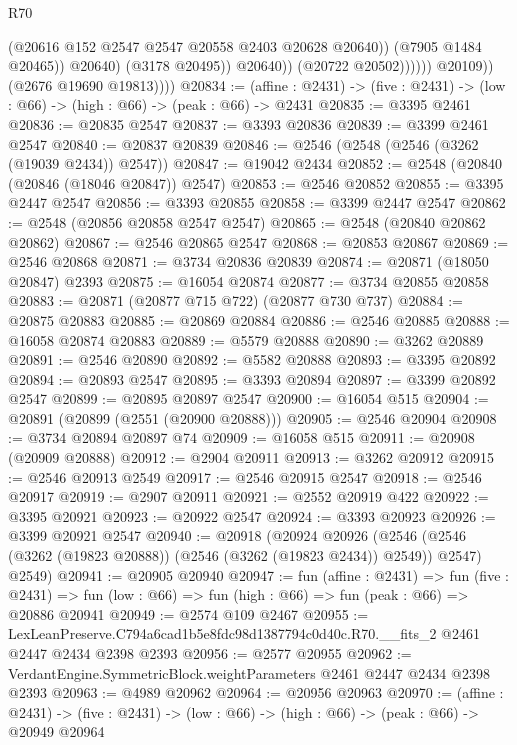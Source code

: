 \begin{lexlean}{R70}
\begin{coremodule}
                                    (@20616 @152 @2547 @2547 @20558 @2403 @20628 @20640))
                                  (@7905 @1484 @20465))
                                @20640)
                              (@3178 @20495))
                            @20640))
                        (@20722 @20502))))))
              @20109))
          (@2676 @19690 @19813))))
@20834 := (affine : @2431) -> (five : @2431) -> (low : @66) -> (high : @66) -> (peak : @66) -> @2431
@20835 := @3395 @2461
@20836 := @20835 @2547
@20837 := @3393 @20836
@20839 := @3399 @2461 @2547
@20840 := @20837 @20839
@20846 := @2546 (@2548 (@2546 (@3262 (@19039 @2434)) @2547))
@20847 := @19042 @2434
@20852 := @2548 (@20840 (@20846 (@18046 @20847)) @2547)
@20853 := @2546 @20852
@20855 := @3395 @2447 @2547
@20856 := @3393 @20855
@20858 := @3399 @2447 @2547
@20862 := @2548 (@20856 @20858 @2547 @2547)
@20865 := @2548 (@20840 @20862 @20862)
@20867 := @2546 @20865 @2547
@20868 := @20853 @20867
@20869 := @2546 @20868
@20871 := @3734 @20836 @20839
@20874 := @20871 (@18050 @20847) @2393
@20875 := @16054 @20874
@20877 := @3734 @20855 @20858
@20883 := @20871 (@20877 @715 @722) (@20877 @730 @737)
@20884 := @20875 @20883
@20885 := @20869 @20884
@20886 := @2546 @20885
@20888 := @16058 @20874 @20883
@20889 := @5579 @20888
@20890 := @3262 @20889
@20891 := @2546 @20890
@20892 := @5582 @20888
@20893 := @3395 @20892
@20894 := @20893 @2547
@20895 := @3393 @20894
@20897 := @3399 @20892 @2547
@20899 := @20895 @20897 @2547
@20900 := @16054 @515
@20904 := @20891 (@20899 (@2551 (@20900 @20888)))
@20905 := @2546 @20904
@20908 := @3734 @20894 @20897 @74
@20909 := @16058 @515
@20911 := @20908 (@20909 @20888)
@20912 := @2904 @20911
@20913 := @3262 @20912
@20915 := @2546 @20913 @2549
@20917 := @2546 @20915 @2547
@20918 := @2546 @20917
@20919 := @2907 @20911
@20921 := @2552 @20919 @422
@20922 := @3395 @20921
@20923 := @20922 @2547
@20924 := @3393 @20923
@20926 := @3399 @20921 @2547
@20940 := @20918
    (@20924
      @20926
      (@2546 (@2546 (@3262 (@19823 @20888)) (@2546 (@3262 (@19823 @2434)) @2549)) @2547)
      @2549)
@20941 := @20905 @20940
@20947 := fun (affine : @2431) =>
  fun (five : @2431) => fun (low : @66) => fun (high : @66) => fun (peak : @66) => @20886 @20941
@20949 := @2574 @109 @2467
@20955 := LexLeanPreserve.C794a6cad1b5e8fdc98d1387794c0d40c.R70.__fits_2
    @2461
    @2447
    @2434
    @2398
    @2393
@20956 := @2577 @20955
@20962 := VerdantEngine.SymmetricBlock.weightParameters @2461 @2447 @2434 @2398 @2393
@20963 := @4989 @20962
@20964 := @20956 @20963
@20970 := (affine : @2431) ->
  (five : @2431) -> (low : @66) -> (high : @66) -> (peak : @66) -> @20949 @20964

\end{coremodule}
\end{lexlean}
